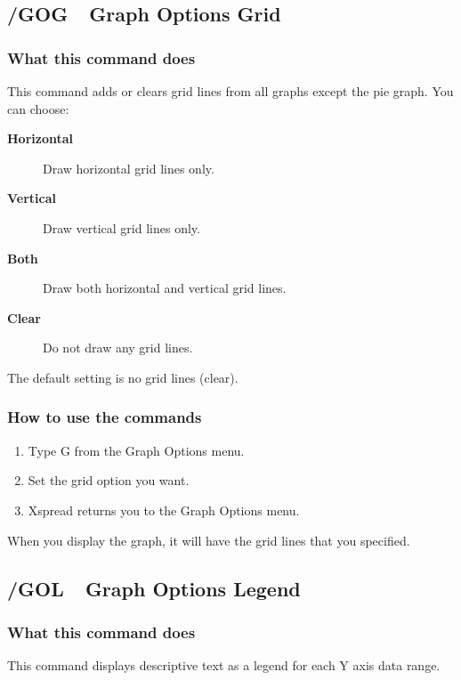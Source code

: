 \subsection*{/GOG\ \     Graph Options Grid}

\subsubsection*{What this command does}
This command adds or clears grid lines from all graphs except the pie 
graph.  You can choose:

\begin{description}
\item[{\bf Horizontal  }]{Draw horizontal grid lines only.}
\item[{\bf Vertical    }]{Draw vertical grid lines only.}
\item[{\bf Both        }]{Draw both horizontal and vertical grid lines.}
\item[{\bf Clear       }]{Do not draw any grid lines.}
\end{description}

The default setting is no grid lines (clear).

\subsubsection*{How to use the commands}
\begin{enumerate}
\item{Type G from the Graph Options menu.}
\item{Set the grid option you want.}
\item{Xspread returns you to the Graph Options menu.}
\end{enumerate}

When you display the graph, it will have the grid lines that you specified.

\subsection*{/GOL\ \     Graph Options Legend}

\subsubsection*{What this command does}
This command displays descriptive text as a legend for each Y axis 
data range.

